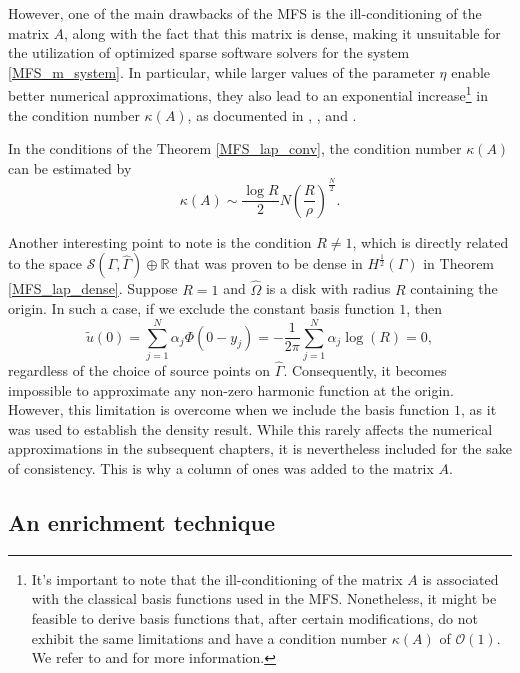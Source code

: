 However, one of the main drawbacks of the \ac{MFS} is the ill-conditioning of the matrix \(A\), along with the fact that this matrix is dense, making it unsuitable for the utilization of optimized sparse software solvers for the system \eqref{MFS_m_system}. In particular, while larger values of the parameter \(\eta\) enable better numerical approximations, they also lead to an exponential increase\footnote{It's important to note that the ill-conditioning of the matrix \(A\) is associated with the classical basis functions used in the \ac{MFS}. Nonetheless, it might be feasible to derive basis functions that, after certain modifications, do not exhibit the same limitations and have a condition number \(\kappa(A)\) of \(\mathcal{O}(1)\). We refer to \cite{antunes2018reducing} and \cite{antunes2018numerical} for more information.} in the condition number \(\kappa(A)\), as documented in \cite{christiansen1981condition}, \cite{kitagawa1988numerical}, and \cite{kitagawa1991asymptotic}.

\begin{theorem}
    In the conditions of the Theorem \ref{MFS_lap_conv}, the condition number \(\kappa(A)\) can be estimated by
    \[
        \kappa(A) \sim \frac{\log R}{2}N \left(\frac{R}{\rho}\right)^{\frac{N}{2}}.
    \]
\end{theorem}

Another interesting point to note is the condition \(R \neq 1\), which is directly related to the space \(\mathcal{S}(\Gamma, \hat{\Gamma}) \oplus \mathbb{R}\) that was proven to be dense in \(H^\frac{1}{2}(\Gamma)\) in Theorem \ref{MFS_lap_dense}. Suppose \(R=1\) and \(\hat{\Omega}\) is a disk with radius \(R\) containing the origin. In such a case, if we exclude the constant basis function \(1\), then
\[
\tilde{u}(0) = \sum_{j=1}^{N}\alpha_j \Phi(0-y_j) = -\frac{1}{2\pi}\sum_{j=1}^{N}\alpha_j \log(R) = 0,
\]
regardless of the choice of source points on \(\hat{\Gamma}\). Consequently, it becomes impossible to approximate any non-zero harmonic function at the origin. However, this limitation is overcome when we include the basis function \(1\), as it was used to establish the density result. While this rarely affects the numerical approximations in the subsequent chapters, it is nevertheless included for the sake of consistency. This is why a column of ones was added to the matrix \(A\).

\subsection{An enrichment technique}\label{m_particular_solutions}

